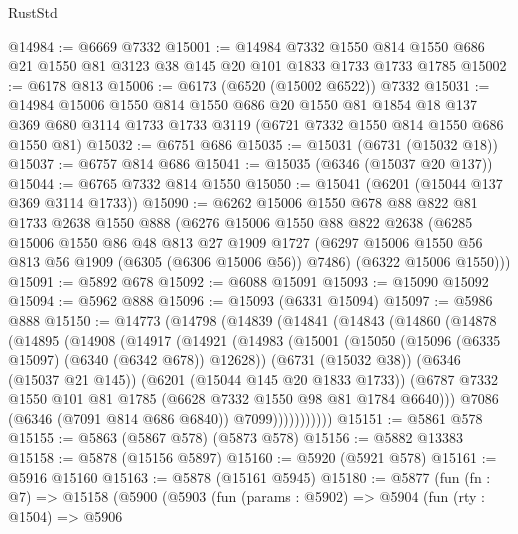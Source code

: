 \begin{lexlean}{RustStd}
\begin{coremodule}
@14984 := @6669 @7332
@15001 := @14984
    @7332
    @1550
    @814
    @1550
    @686
    @21
    @1550
    @81
    @3123
    @38
    @145
    @20
    @101
    @1833
    @1733
    @1733
    @1785
@15002 := @6178 @813
@15006 := @6173 (@6520 (@15002 @6522)) @7332
@15031 := @14984
    @15006
    @1550
    @814
    @1550
    @686
    @20
    @1550
    @81
    @1854
    @18
    @137
    @369
    @680
    @3114
    @1733
    @1733
    @3119
    (@6721 @7332 @1550 @814 @1550 @686 @1550 @81)
@15032 := @6751 @686
@15035 := @15031 (@6731 (@15032 @18))
@15037 := @6757 @814 @686
@15041 := @15035 (@6346 (@15037 @20 @137))
@15044 := @6765 @7332 @814 @1550
@15050 := @15041 (@6201 (@15044 @137 @369 @3114 @1733))
@15090 := @6262
    @15006
    @1550
    @678
    @88
    @822
    @81
    @1733
    @2638
    @1550
    @888
    (@6276
      @15006
      @1550
      @88
      @822
      @2638
      (@6285
        @15006
        @1550
        @86
        @48
        @813
        @27
        @1909
        @1727
        (@6297 @15006 @1550 @56 @813 @56 @1909 (@6305 (@6306 @15006 @56)) @7486)
        (@6322 @15006 @1550)))
@15091 := @5892 @678
@15092 := @6088 @15091
@15093 := @15090 @15092
@15094 := @5962 @888
@15096 := @15093 (@6331 @15094)
@15097 := @5986 @888
@15150 := @14773
    (@14798
      (@14839
        (@14841
          (@14843
            (@14860
              (@14878
                (@14895
                  (@14908
                    (@14917
                      (@14921
                        (@14983
                          (@15001
                            (@15050 (@15096 (@6335 @15097) (@6340 (@6342 @678)) @12628))
                            (@6731 (@15032 @38))
                            (@6346 (@15037 @21 @145))
                            (@6201 (@15044 @145 @20 @1833 @1733))
                            (@6787
                              @7332
                              @1550
                              @101
                              @81
                              @1785
                              (@6628 @7332 @1550 @98 @81 @1784 @6640)))
                          @7086
                          (@6346 (@7091 @814 @686 @6840))
                          @7099)))))))))))
@15151 := @5861 @578
@15155 := @5863 (@5867 @578) (@5873 @578)
@15156 := @5882 @13383
@15158 := @5878 (@15156 @5897)
@15160 := @5920 (@5921 @578)
@15161 := @5916 @15160
@15163 := @5878 (@15161 @5945)
@15180 := @5877
    (fun (fn : @7) =>
    @15158
      (@5900
        (@5903
          (fun (params : @5902) =>
          @5904
            (fun (rty : @1504) =>
            @5906

\end{coremodule}
\end{lexlean}
